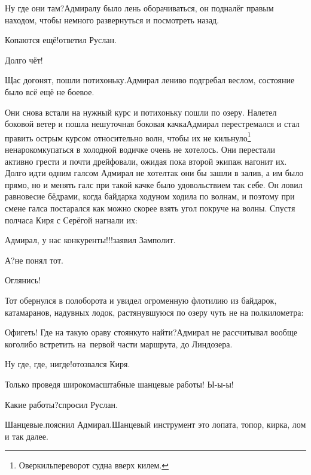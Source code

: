 \diagdash Ну где они там?\mdash Адмиралу было лень оборачиваться, он подналёг правым находом, чтобы немного развернуться и посмотреть назад.

\diagdash Копаются ещё!\mdash ответил Руслан.

\diagdash Долго чёт!

\diagdash Щас догонят, пошли потихоньку.\mdash Адмирал лениво подгребал веслом, состояние было всё ещё не боевое.

\renewcommand*{\thefootnote}{\fnsymbol{footnote}}
\setcounter{footnote}{0}
Они снова встали на нужный курс и потихоньку пошли по озеру. Налетел боковой ветер и пошла нешуточная боковая качка\mdash Адмирал перестремался и стал править острым курсом относительно волн, чтобы их не кильнуло\footnote{Оверкиль\mdash переворот судна вверх килем\cite{МорскойСправочник}.} ненароком\mdash купаться в холодной водичке очень не хотелось. Они перестали активно грести и почти дрейфовали, ожидая пока второй экипаж нагонит их. Долго идти одним галсом Адмирал не хотел\mdash так они бы зашли в залив, а им было прямо, но и менять галс при такой качке было удовольствием так себе. Он ловил равновесие бёдрами, когда байдарка ходуном ходила по волнам, и поэтому при смене галса постарался как можно скорее взять угол покруче на волны. Спустя полчаса Киря с Серёгой нагнали их:


\diagdash Адмирал, у нас конкуренты!!!\mdash заявил Замполит.

\diagdash А?\mdash не понял тот.

\diagdash Оглянись!

Тот обернулся в пол\sdash оборота и увидел огроменную флотилию из байдарок, катамаранов, надувных лодок, растянувшуюся по озеру чуть не на полкилометра: 

\diagdash Офигеть! Где на такую ораву стоянку\sdash то найти?\mdash Адмирал не рассчитывал вообще кого\sdash либо встретить на~первой части маршрута, до Линдозера.

\diagdash Ну где, где, нигде!\mdash отозвался Киря. 

\diagdash Только проведя широкомасштабные шанцевые работы! Ы-ы-ы!

\diagdash Какие работы?\mdash спросил Руслан.

\diagdash Шанцевые.\mdash пояснил Адмирал.\mdash Шанцевый инструмент это лопата, топор, кирка, лом и так далее.

